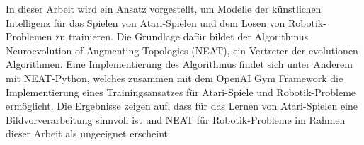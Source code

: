 
\Abstract
In dieser Arbeit wird ein Ansatz vorgestellt, um Modelle der künstlichen Intelligenz für das Spielen von Atari-Spielen und dem Lösen von Robotik-Problemen zu trainieren. Die Grundlage dafür bildet der Algorithmus Neuroevolution of Augmenting Topologies (NEAT), ein Vertreter der evolutionen Algorithmen. Eine Implementierung des Algorithmus findet sich unter Anderem mit NEAT-Python, welches zusammen mit dem OpenAI Gym Framework die Implementierung eines Trainingsansatzes für Atari-Spiele und Robotik-Probleme ermöglicht. Die Ergebnisse zeigen auf, dass für das Lernen von Atari-Spielen eine Bildvorverarbeitung sinnvoll ist und NEAT für Robotik-Probleme im Rahmen dieser Arbeit als ungeeignet erscheint.